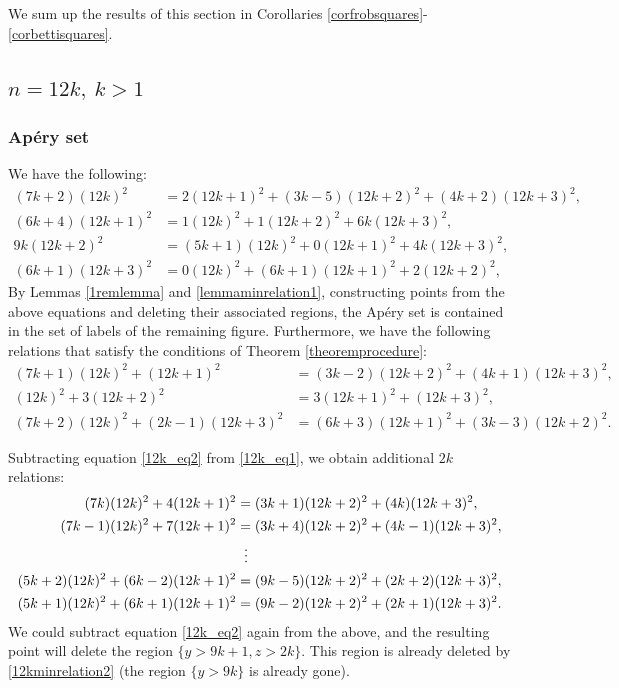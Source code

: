 \documentclass[12pt]{article}
\theoremstyle{remark}
\begin{document}
We sum up the results of this section in Corollaries \ref{corfrobsquares}-\ref{corbettisquares}.





\subsection{$n=12k, \ k>1$}

\subsubsection{Ap{\'e}ry set}
We have the following:
\begin{align}
    (7k+2)(12k)^2 &= 2(12k+1)^2 + (3k-5)(12k+2)^2 + (4k+2)(12k+3)^2, \label{12kminrelation0} \\
    (6k+4)(12k+1)^2 &= 1(12k)^2 + 1(12k+2)^2 + 6k(12k+3)^2, \label{12kminrelation1} \\
    9k(12k+2)^2 &= (5k+1)(12k)^2 + 0(12k+1)^2 + 4k(12k+3)^2, \label{12kminrelation2}\\
    (6k+1)(12k+3)^2 &= 0(12k)^2 + (6k+1)(12k+1)^2 + 2(12k+2)^2,  \label{12kminrelation3}
\end{align}
By Lemmas \ref{1remlemma} and \ref{lemmaminrelation1}, constructing points from the above equations and deleting their associated regions, the Ap{\'e}ry set is contained in the set of labels of the remaining figure.
Furthermore, we have the following relations that satisfy the conditions of Theorem \ref{theoremprocedure}:
\begin{align}
    (7k+1)(12k)^2 + (12k+1)^2 &= (3k-2)(12k+2)^2 + (4k+1)(12k+3)^2,\label{12k_eq1}\\
    (12k)^2 + 3(12k+2)^2 &= 3(12k+1)^2 + (12k+3)^2,\label{12k_eq2}\\
    (7k+2)(12k)^2 + (2k-1)(12k+3)^2 &= (6k+3)(12k+1)^2 + (3k-3)(12k+2)^2. \label{12k_eq3}
\end{align}

Subtracting equation \eqref{12k_eq2} from \eqref{12k_eq1}, we obtain additional $2k$ relations:
\begin{equation}\label{12k_2kequations_1}
\begin{aligned}    
(7k)(12k)^2 + 4(12k+1)^2 &= (3k+1)(12k+2)^2 + (4k)(12k+3)^2 ,\\
(7k-1)(12k)^2 + 7(12k+1)^2 &= (3k+4)(12k+2)^2 + (4k-1)(12k+3)^2 ,\\
 & \hspace{5.6pt}  \vdots      \\
(5k+2)(12k)^2 + (6k-2)(12k+1)^2 &= (9k-5)(12k+2)^2 + (2k+2)(12k+3)^2 ,\\
(5k+1)(12k)^2 + (6k+1)(12k+1)^2 &= (9k-2)(12k+2)^2 + (2k+1)(12k+3)^2 .
\end{aligned}
\end{equation}
We could subtract equation \eqref{12k_eq2} again from the above, and the resulting point will delete the region $\{y > 9k+1, z > 2k\}$. This region is already deleted by \eqref{12kminrelation2} (the region $\{y > 9k\}$ is already gone). 
\end{document}
